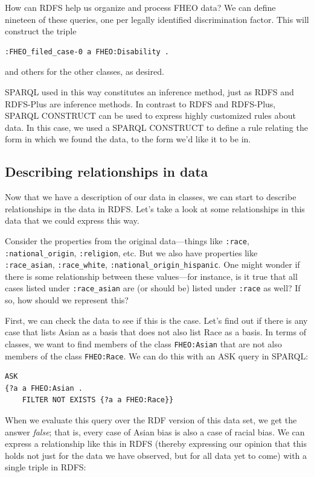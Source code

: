 \begin{challenge}{How can RDFS help us organize and process FHEO data?}
We can define nineteen of these queries, one per legally identified
discrimination factor. This will construct the triple

\begin{lstlisting}
:FHEO_filed_case-0 a FHEO:Disability .
\end{lstlisting}

and others for the other classes, as desired.
\end{challenge}

SPARQL used in this way constitutes an inference method, just as RDFS
and RDFS-Plus are inference methods. In contrast to RDFS and RDFS-Plus,
SPARQL CONSTRUCT can be used to express highly customized rules about
data. In this case, we used a SPARQL CONSTRUCT to define a rule relating
the form in which we found the data, to the form we'd like it to be in.

\subsection{Describing relationships in data}

Now that we have a description of our data in classes, we can start to
describe relationships in the data in RDFS. Let's take a look at some
relationships in this data that we could express this way.

Consider the properties from the original data---things like \texttt{:race},
\texttt{:national\_origin},
\texttt{:religion}, etc. But we also have properties like \texttt{:race\_asian},
\texttt{:race\_white},
\texttt{:national\_origin\_hispanic}. One might wonder if there is some
relationship between these
values---for instance, is it true that all cases listed under
\texttt{:race\_asian} are (or should be) listed under
\texttt{:race} as well? If so, how should we represent this?

First, we can check the data to see if this is the case. Let's find out
if there is any case that lists Asian as a basis that does not also list
Race as a basis. In terms of classes, we want to find members of the
class \texttt{FHEO:Asian} that are not also members of the class \texttt{FHEO:Race}. We
can do this with an ASK query in SPARQL:

\begin{lstlisting}
ASK
{?a a FHEO:Asian .
    FILTER NOT EXISTS {?a a FHEO:Race}}
\end{lstlisting}

When we evaluate this query over the RDF version of this data set, we
get the answer \textit{false}; that is, every case of Asian bias is also a case
of racial bias. We can express a relationship like this in RDFS (thereby
expressing our opinion that this holds not just for the data we have
observed, but for all data yet to come) with a single triple in RDFS:

